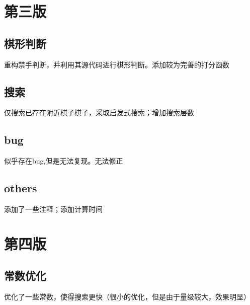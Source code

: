 \documentclass[a4paper,12pt, fontset=windows]{ctexart}
\begin{document}
\section{第三版}

\subsection{棋形判断}
重构禁手判断，并利用其源代码进行棋形判断。添加较为完善的打分函数

\subsection{搜索}
仅搜索已存在附近棋子棋子，采取启发式搜索；增加搜索层数

\subsection{bug}
似乎存在bug,但是无法复现。无法修正

\subsection{others}
添加了一些注释；添加计算时间

\section{第四版}

\subsection{常数优化}
优化了一些常数，使得搜索更快（很小的优化，但是由于量级较大，效果明显）
\end{document}
